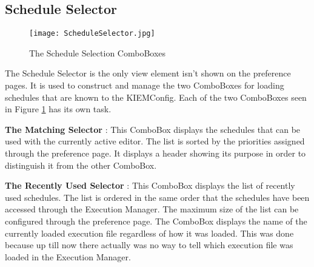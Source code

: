 \subsection{Schedule Selector}
\label{section:ScheduleSelector}
\begin{figure}
  \centering
  \texttt{[image: ScheduleSelector.jpg]}
  \caption[The Schedule Selection ComboBoxes]%
  {The Schedule Selection ComboBoxes\protect}
  \label{fig:ScheduleSelector}
\end{figure}
The Schedule Selector is the only view element isn't shown on the preference pages. It is used
to construct and manage the two ComboBoxes for loading schedules that are known to
the \ac{KIEMConfig}. Each of the two ComboBoxes seen in Figure \ref{fig:ScheduleSelector} has its own task.
\begin{description}
 \item \textbf{The Matching Selector} : This ComboBox displays the schedules that can be used with
the currently active editor. The list is sorted by the priorities assigned through the preference page.
It displays a header showing its purpose in order to distinguish it from the other ComboBox.
 \item \textbf{The Recently Used Selector} : This ComboBox displays the list of recently used schedules.
The list is ordered in the same order that the schedules have been accessed through the Execution Manager.
The maximum size of the list can be configured through the preference page. The ComboBox displays the name
of the currently loaded execution file regardless of how it was loaded. This was done because up till now 
there actually was no way to tell which execution file was loaded in the Execution Manager.
\end{description}

